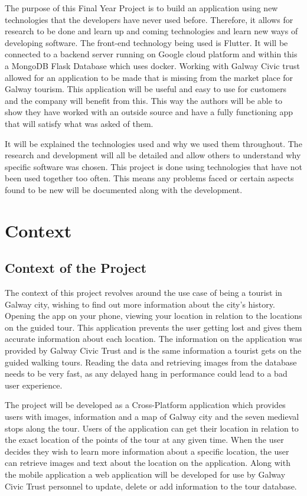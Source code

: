 The purpose of this Final Year Project is to build an application using new technologies that the developers have never used before. Therefore, it allows for research to be done and learn up and coming technologies and learn new ways of developing software. The front-end technology being used is Flutter. It will be connected to a backend server running on Google cloud platform and within this a MongoDB Flask Database which uses docker. Working with Galway Civic trust allowed for an application to be made that is missing from the market place for Galway tourism. This application will be useful and easy to use for customers and the company will benefit from this.  This way the authors will be able to show they have worked with an outside source and have a fully functioning app that will satisfy what was asked of them.


It will be explained the technologies used and why we used them throughout. The research and development will all be detailed and allow others to understand why specific software was chosen. This project is done using technologies that have not been used together too often. This means any problems faced or certain aspects found to be new will be documented along with the development.
\section{Context}

\subsection{Context of the Project}

The context of this project revolves around the use case of being a tourist in Galway city, wishing to find out more information about the city's history. Opening the app on your phone, viewing your location in relation to the locations on the guided tour. This application prevents the user getting lost and gives them accurate information about each location.  The information on the application was provided by Galway Civic Trust and is the same information a tourist gets on the guided walking tours. Reading the data and retrieving images from the database needs to be very fast, as any delayed hang in performance could lead to a bad user experience.

The project will be developed as a Cross-Platform application which provides users with images, information and a map of Galway city and the seven medieval stops along the tour. Users of the application can get their location in relation to the exact location of the points of the tour at any given time. When the user decides they wish to learn more information about a specific location, the user can retrieve images and text about the location on the application. Along with the  mobile application a web application will be developed for use by Galway Civic Trust personnel to update, delete or add information to the tour database.

